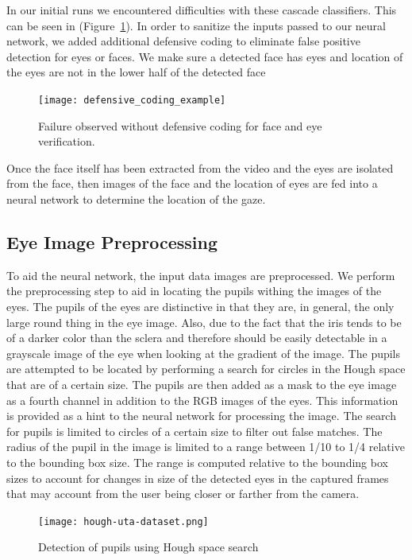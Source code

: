 \documentclass[10pt,twocolumn,letterpaper]{article}
\begin{document}
In our initial runs we encountered difficulties with these cascade classifiers.
This can be seen in  (Figure~\ref{fig:defensive}).
In order to sanitize the inputs passed to our neural network, we added 
additional defensive coding to eliminate false positive detection 
for eyes or faces. We make sure a detected face has eyes 
and location of the eyes are not in the lower half of the detected face

\begin{figure}
  \begin{center}
    \texttt{[image: defensive\_coding\_example]}
  \end{center}
  \caption{Failure observed without defensive coding for face and eye
    verification.}
  \label{fig:defensive}
\end{figure}


Once the face itself has been extracted from the video and the eyes
are isolated from the face, then images  of the face and the location
of eyes are fed into a neural network to determine the location of the
gaze.

\subsection{Eye Image Preprocessing}
To aid the neural network, the input data images are preprocessed. We
perform the preprocessing step to aid in locating the pupils withing
the images of the eyes. The pupils of the eyes are distinctive in that
they are, in general, the only large round thing in the eye image. Also,
due to the fact that the iris tends to be of a darker color than the
sclera and therefore should be easily detectable in a grayscale image of the
eye when looking at the gradient of the image. The pupils are
attempted to be located by performing a search for circles in the
Hough space that are of a certain size. The pupils are then added as a
mask to the eye image as a fourth channel in addition to the RGB
images of the eyes. This information is provided as a hint to the
neural network for processing the image. The search for pupils is
limited to circles of a certain size to filter out false matches. The radius of the pupil
in the image is limited to a range between 1/10 to 1/4 relative to the
bounding box size. The range is computed relative to the bounding box
sizes to account for changes in size of the detected eyes in the
captured frames that may account from the user being closer or farther
from the camera. 

\begin{figure}[!h]
  \begin{center}
    \texttt{[image: hough-uta-dataset.png]}
    \caption{Detection of pupils using Hough space search}
    \label{fig:hough-pupils-uta}
  \end{center}
\end{figure}
\end{document}
